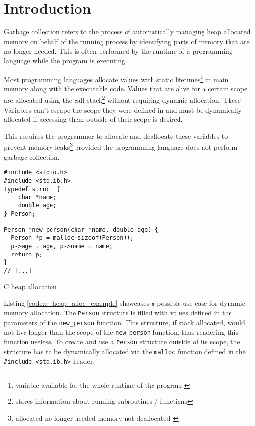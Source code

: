 \chapter{Introduction}
\label{sec:introduction}

Garbage collection refers to the process of automatically managing heap
allocated memory on behalf of the running process by identifying parts of
memory that are no longer needed. This is often performed by the runtime of a
programming language while the program is executing.
\cite[Introduction]{go_gcguide_2022} \cite[Introduction]{go_spec_2023} 

Most programming languages allocate values with static
lifetimes\footnote{variable available for the whole runtime of the program
\cite[Abstract]{static-dynamic-scope_tanter_2009}} in main memory along with
the executable code. Values that are alive for a certain scope are allocated
using the call stack\footnote{stores information about running subroutines /
functions\cite[2.2 Call Stacks]{call-stack_mcmaster-memon_2006}} without
requiring dynamic allocation. These Variables can't escape the scope they were
defined in and must be dynamically allocated if accessing them outside of
their scope is desired.

This requires the programmer to allocate and deallocate these
variables to prevent memory leaks\footnote{allocated no longer needed memory
not deallocated \cite[1.2.1 A Practical Object Ownership
Model]{practical_heine-lam_2003}} provided the programming language does not
perform garbage collection. 

\begin{listing}[H] 
    \begin{verbatim} 
#include <stdio.h>
#include <stdlib.h>
typedef struct { 
    char *name;
    double age; 
} Person;

Person *new_person(char *name, double age) {
  Person *p = malloc(sizeof(Person));
  p->age = age, p->name = name;
  return p;
}
// [...]
    \end{verbatim}
    \caption{C heap allocation}
    \label{code:c_heap_alloc_example}
\end{listing}

Listing \autoref{code:c_heap_alloc_example} showcases a possible use case for
dynamic memory allocation. The \texttt{Person} structure is filled with values
defined in the parameters of the \texttt{new\_person} function. This structure,
if stack allocated, would not live longer than the scope of the
\texttt{new\_person} function, thus rendering this function useless. To create
and use a \texttt{Person} structure outside of its scope, the structure has to
be dynamically allocated via the \texttt{malloc} function defined in the
\texttt{#include <stdlib.h>} header.

